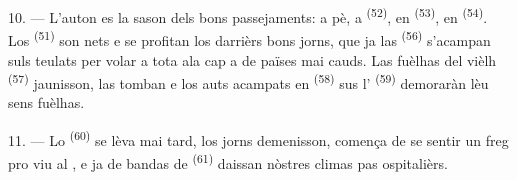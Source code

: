 10. --- L'auton es la sason dels bons passejaments: a pè, a 
\textsuperscript{(52)}, en  \textsuperscript{(53)}, en
 \textsuperscript{(54)}. Los 
\textsuperscript{(51)} son nets e se profitan los darrièrs bons jorns, que ja las
 \textsuperscript{(56)} s'acampan suls teulats per volar a tota
ala cap a de païses mai cauds. Las fuèlhas del vièlh 
\textsuperscript{(57)} jaunisson, las  tomban e los auts
 acampats en  \textsuperscript{(58)} sus
l' \textsuperscript{(59)} demoraràn lèu sens fuèlhas.

11. --- Lo  \textsuperscript{(60)} se lèva mai tard, los jorns
demenisson, comença de se sentir un freg pro viu al , e ja de
bandas de  \textsuperscript{(61)} daissan nòstres climas pas
ospitalièrs.
\VUsaut{6.0mm}
\VUfilet{22mm}
